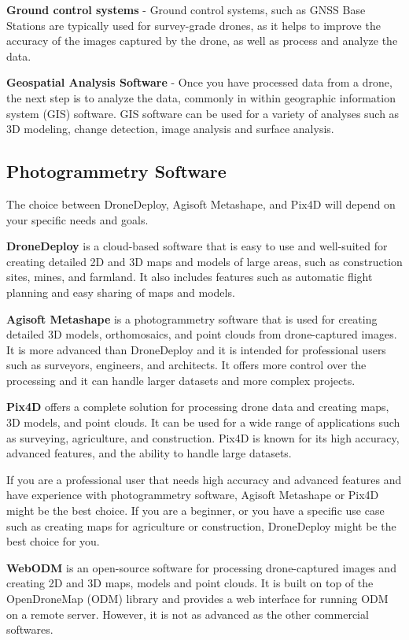 \documentclass[
  12pt,
]{book}
\begin{document}
\textbf{Ground control systems} - Ground control systems, such as GNSS Base Stations are typically used for survey-grade drones, as it helps to improve the accuracy of the images captured by the drone, as well as process and analyze the data.

\textbf{Geospatial Analysis Software} - Once you have processed data from a drone, the next step is to analyze the data, commonly in within geographic information system (GIS) software. GIS software can be used for a variety of analyses such as 3D modeling, change detection, image analysis and surface analysis.

\subsection{Photogrammetry Software}\label{photogrammetry-software}

The choice between DroneDeploy, Agisoft Metashape, and Pix4D will depend on your specific needs and goals.

\textbf{DroneDeploy} is a cloud-based software that is easy to use and well-suited for creating detailed 2D and 3D maps and models of large areas, such as construction sites, mines, and farmland. It also includes features such as automatic flight planning and easy sharing of maps and models.

\textbf{Agisoft Metashape} is a photogrammetry software that is used for creating detailed 3D models, orthomosaics, and point clouds from drone-captured images. It is more advanced than DroneDeploy and it is intended for professional users such as surveyors, engineers, and architects. It offers more control over the processing and it can handle larger datasets and more complex projects.

\textbf{Pix4D} offers a complete solution for processing drone data and creating maps, 3D models, and point clouds. It can be used for a wide range of applications such as surveying, agriculture, and construction. Pix4D is known for its high accuracy, advanced features, and the ability to handle large datasets.

If you are a professional user that needs high accuracy and advanced features and have experience with photogrammetry software, Agisoft Metashape or Pix4D might be the best choice. If you are a beginner, or you have a specific use case such as creating maps for agriculture or construction, DroneDeploy might be the best choice for you.

\textbf{WebODM} is an open-source software for processing drone-captured images and creating 2D and 3D maps, models and point clouds. It is built on top of the OpenDroneMap (ODM) library and provides a web interface for running ODM on a remote server. However, it is not as advanced as the other commercial softwares.
\end{document}
